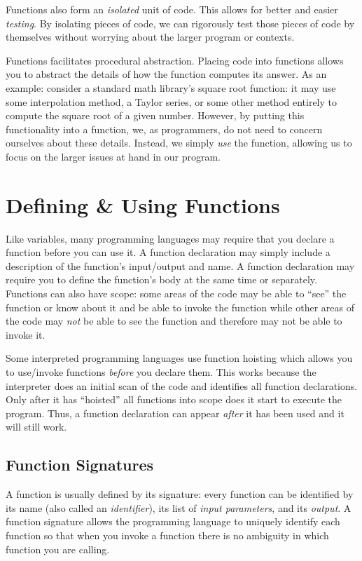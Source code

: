 Functions also form an \emph{isolated} unit of code.  This allows for 
better and easier \emph{testing}.  By isolating pieces of code, we can 
rigorously test those pieces of code by themselves without worrying 
about the larger program or contexts.  

Functions facilitates  
\gls{procedural abstraction}.  Placing code 
into functions allows you to abstract the details of how the function computes 
its answer.  As an example: consider a standard math library's square root
function: it may use some interpolation method, a Taylor series, or some 
other method entirely to compute the square root of a given number.  
However, by putting this functionality into a function, we, as programmers, 
do not need to concern ourselves about these details.  Instead, we simply 
\emph{use} the function, allowing us to focus on the larger issues at hand 
in our program.

\section{Defining \& Using Functions}

Like variables, many programming languages may require that you declare a 
function before you can use it.  A function
declaration may simply include a description of the function's input/output
and name.  A function declaration may require you to define
the function's body at the same time or separately.  Functions can also
have  scope: some areas of the code may be able to ``see'' the function
or know about it and be able to invoke the function while other areas of
the code may \emph{not} be able to see the function and therefore may
not be able to invoke it.  

Some interpreted programming languages use function  \gls{hoisting} which allows
you to use/invoke functions \emph{before} you declare them.  This works
because the interpreter does an initial scan of the code and
identifies all function declarations.  Only after it has ``hoisted'' all functions
into scope does it start to execute the program.  Thus, a function declaration
can appear \emph{after} it has been used and it will still work.

\subsection{Function Signatures}

A function is usually defined by its \gls{signature}: every function can be
identified by its name (also called an \emph{identifier}), its list of 
\emph{input parameters}, and its \emph{output}.  A function signature
allows the programming language to uniquely identify each function
so that when you invoke a function there is no ambiguity in which function
you are calling.


